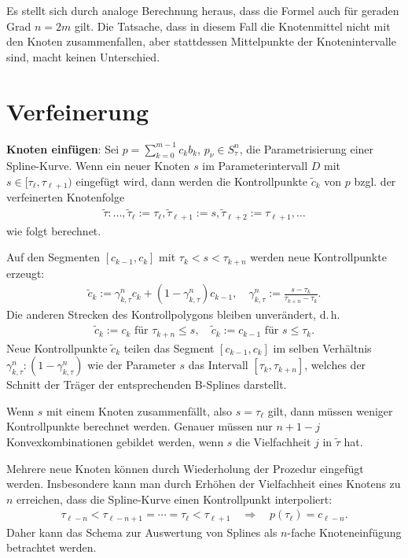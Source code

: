 Es stellt sich durch analoge Berechnung heraus, dass die Formel auch für geraden Grad $n = 2m$
gilt.
Die Tatsache, dass in diesem Fall die Knotenmittel nicht mit den Knoten zusammenfallen, aber
stattdessen Mittelpunkte der Knotenintervalle sind, macht keinen Unterschied.

\pagebreak

\section{%
    Verfeinerung%
}

\textbf{Knoten einfügen}:
Sei $p = \sum_{k=0}^{m-1} c_k b_k$, $p_\nu \in S_\tau^n$, die Parametrisierung einer Spline-Kurve.
Wenn ein neuer Knoten $s$ im Parameterintervall $D$ mit $s \in [\tau_\ell, \tau_{\ell+1})$
eingefügt wird, dann werden die Kontrollpunkte $\widetilde{c}_k$ von $p$ bzgl. der
verfeinerten Knotenfolge
\begin{align*}
    \widetilde{\tau}\colon \dotsc, \widetilde{\tau}_\ell := \tau_\ell,
    \widetilde{\tau}_{\ell+1} := s, \widetilde{\tau}_{\ell+2} := \tau_{\ell+1}, \dotsc
\end{align*}
wie folgt berechnet.

Auf den Segmenten $[c_{k-1}, c_k]$ mit $\tau_k < s < \tau_{k+n}$ werden neue Kontrollpunkte
erzeugt:
\begin{align*}
    \widetilde{c}_k := \gamma_{k,\tau}^n c_k + (1 - \gamma_{k,\tau}^n) c_{k-1},\quad
    \gamma_{k,\tau}^n := \frac{s - \tau_k}{\tau_{k+n} - \tau_k}.
\end{align*}
Die anderen Strecken des Kontrollpolygons bleiben unverändert, d.\,h.
\begin{align*}
    \widetilde{c}_k := c_k \text{ für } \tau_{k+n} \le s,\quad
    \widetilde{c}_k := c_{k-1} \text{ für } s \le \tau_k.
\end{align*}
Neue Kontrollpunkte $\widetilde{c}_k$ teilen das Segment $[c_{k-1}, c_k]$ im selben Verhältnis
$\gamma_{k,\tau}^n : (1 - \gamma_{k,\tau}^n)$
wie der Parameter $s$ das Intervall $[\tau_k, \tau_{k+n}]$,
welches der Schnitt der Träger der entsprechenden B-Splines darstellt.

Wenn $s$ mit einem Knoten zusammenfällt, also $s = \tau_\ell$ gilt,
dann müssen weniger Kontrollpunkte berechnet werden.
Genauer müssen nur $n + 1 - j$ Konvexkombinationen gebildet werden,
wenn $s$ die Vielfachheit $j$ in $\widetilde{\tau}$ hat.

Mehrere neue Knoten können durch Wiederholung der Prozedur eingefügt werden.
Insbesondere kann man durch Erhöhen der Vielfachheit eines Knotens zu $n$ erreichen,
dass die Spline-Kurve einen Kontrollpunkt interpoliert:
\begin{align*}
    \tau_{\ell-n} < \tau_{\ell-n+1} = \dotsb = \tau_\ell < \tau_{\ell+1}
    \quad\Rightarrow\quad p(\tau_\ell) = c_{\ell-n}.
\end{align*}
Daher kann das Schema zur Auswertung von Splines als $n$-fache Knoteneinfügung betrachtet werden.

